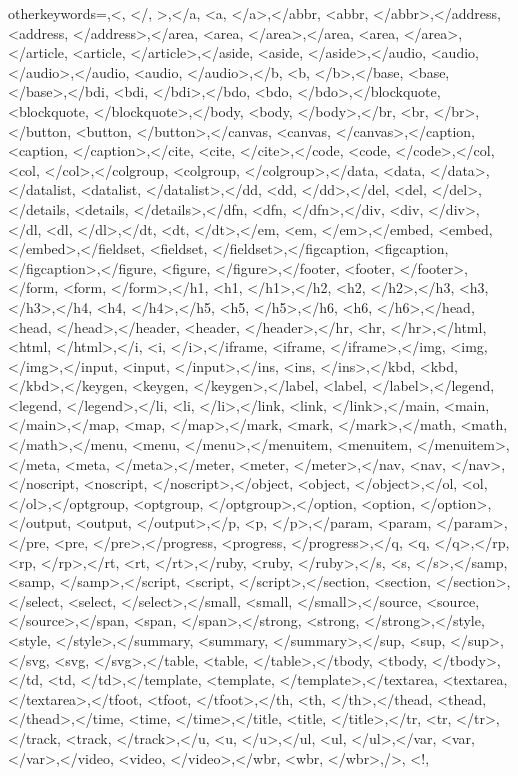 {    %
    otherkeywords={\/,<, </, >,</a, <a, </a>,</abbr, <abbr, </abbr>,</address, <address, </address>,</area, <area, </area>,</area, <area, </area>,</article, <article, </article>,</aside, <aside, </aside>,</audio, <audio, </audio>,</audio, <audio, </audio>,</b, <b, </b>,</base, <base, </base>,</bdi, <bdi, </bdi>,</bdo, <bdo, </bdo>,</blockquote, <blockquote, </blockquote>,</body, <body, </body>,</br, <br, </br>,</button, <button, </button>,</canvas, <canvas, </canvas>,</caption, <caption, </caption>,</cite, <cite, </cite>,</code, <code, </code>,</col, <col, </col>,</colgroup, <colgroup, </colgroup>,</data, <data, </data>,</datalist, <datalist, </datalist>,</dd, <dd, </dd>,</del, <del, </del>,</details, <details, </details>,</dfn, <dfn, </dfn>,</div, <div, </div>,</dl, <dl, </dl>,</dt, <dt, </dt>,</em, <em, </em>,</embed, <embed, </embed>,</fieldset, <fieldset, </fieldset>,</figcaption, <figcaption, </figcaption>,</figure, <figure, </figure>,</footer, <footer, </footer>,</form, <form, </form>,</h1, <h1, </h1>,</h2, <h2, </h2>,</h3, <h3, </h3>,</h4, <h4, </h4>,</h5, <h5, </h5>,</h6, <h6, </h6>,</head, <head, </head>,</header, <header, </header>,</hr, <hr, </hr>,</html, <html, </html>,</i, <i, </i>,</iframe, <iframe, </iframe>,</img, <img, </img>,</input, <input, </input>,</ins, <ins, </ins>,</kbd, <kbd, </kbd>,</keygen, <keygen, </keygen>,</label, <label, </label>,</legend, <legend, </legend>,</li, <li, </li>,</link, <link, </link>,</main, <main, </main>,</map, <map, </map>,</mark, <mark, </mark>,</math, <math, </math>,</menu, <menu, </menu>,</menuitem, <menuitem, </menuitem>,</meta, <meta, </meta>,</meter, <meter, </meter>,</nav, <nav, </nav>,</noscript, <noscript, </noscript>,</object, <object, </object>,</ol, <ol, </ol>,</optgroup, <optgroup, </optgroup>,</option, <option, </option>,</output, <output, </output>,</p, <p, </p>,</param, <param, </param>,</pre, <pre, </pre>,</progress, <progress, </progress>,</q, <q, </q>,</rp, <rp, </rp>,</rt, <rt, </rt>,</ruby, <ruby, </ruby>,</s, <s, </s>,</samp, <samp, </samp>,</script, <script, </script>,</section, <section, </section>,</select, <select, </select>,</small, <small, </small>,</source, <source, </source>,</span, <span, </span>,</strong, <strong, </strong>,</style, <style, </style>,</summary, <summary, </summary>,</sup, <sup, </sup>,</svg, <svg, </svg>,</table, <table, </table>,</tbody, <tbody, </tbody>,</td, <td, </td>,</template, <template, </template>,</textarea, <textarea, </textarea>,</tfoot, <tfoot, </tfoot>,</th, <th, </th>,</thead, <thead, </thead>,</time, <time, </time>,</title, <title, </title>,</tr, <tr, </tr>,</track, <track, </track>,</u, <u, </u>,</ul, <ul, </ul>,</var, <var, </var>,</video, <video, </video>,</wbr, <wbr, </wbr>,/>, <!},   
}
